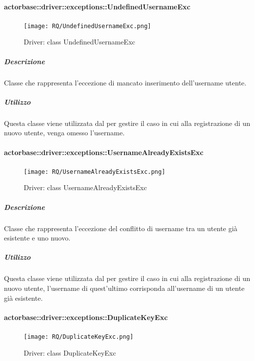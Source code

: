 \documentclass{scalatekids-article}
\begin{document}
\paragraph{actorbase::driver::exceptions::UndefinedUsernameExc}

\begin{figure}[H]
  \begin{center}
    \texttt{[image: RQ/UndefinedUsernameExc.png]}
    \caption{Driver: class UndefinedUsernameExc}
  \end{center}
\end{figure}

\subparagraph{Descrizione}

Classe che rappresenta l'eccezione di mancato inserimento dell'username utente.

\subparagraph{Utilizzo}

Questa classe viene utilizzata dal  per gestire il caso in cui alla registrazione di un nuovo utente, venga omesso l'username.

\paragraph{actorbase::driver::exceptions::UsernameAlreadyExistsExc}

\begin{figure}[H]
  \begin{center}
    \texttt{[image: RQ/UsernameAlreadyExistsExc.png]}
    \caption{Driver: class UsernameAlreadyExistsExc}
  \end{center}
\end{figure}

\subparagraph{Descrizione}

Classe che rappresenta l'eccezione del conflitto di username tra un utente già esistente e uno nuovo.

\subparagraph{Utilizzo}

Questa classe viene utilizzata dal  per gestire il caso in cui alla registrazione di un nuovo utente, l'username di quest'ultimo corrisponda all'username di un utente già esistente.

\paragraph{actorbase::driver::exceptions::DuplicateKeyExc}

\begin{figure}[H]
  \begin{center}
    \texttt{[image: RQ/DuplicateKeyExc.png]}
    \caption{Driver: class DuplicateKeyExc}
  \end{center}
\end{figure}
\end{document}
